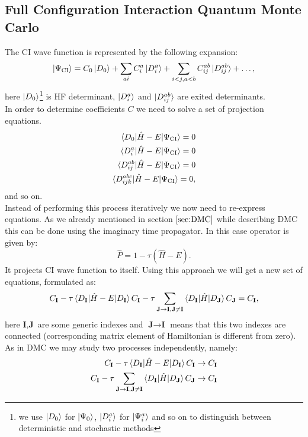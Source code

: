 \documentclass[twoside,english]{uiofysmaster}
\theoremstyle{definition}
\begin{document}
\subsection{Full Configuration Interaction Quantum Monte Carlo}
The CI wave function is represented by the following expansion:
 \begin{equation}\label{eq:fciqmcWF}
\ket{\Psi_{\text{CI}}}= C_0\ket{D_0} + \sum_{ai} C_i^a \ket{D_i^a} + \sum_{i<j,a<b}C_{ij}^{ab}\ket{D_{ij}^{ab}} + \dots,
 \end{equation}
here $\ket{D_0}$\footnote{we use $\ket{D_0}$ for $\ket{\Psi_0}$, $\ket{D_i^a}$ for $\ket{\Psi_i^a}$ and so on to distinguish between deterministic and stochastic methods} is HF determinant, $\ket{D_i^a}$ and $\ket{D_{ij}^{ab}}$ are exited determinants.\\
In order to determine coefficients $C$ we need to solve a set of projection equations. 
\begin{align}
\braket{D_0|\hat{H}-E|\Psi_{\text{CI}}}=0\\
\braket{D_i^a|\hat{H}-E|\Psi_{\text{CI}}}=0\\
\braket{D_{ij}^{ab}|\hat{H}-E|\Psi_{\text{CI}}}=0\\
\braket{D_{ijk}^{abc}|\hat{H}-E|\Psi_{\text{CI}}}=0,
\end{align} 
and so on.\\
Instead of performing this process iteratively we now need to re-express equations. As we already mentioned in section $\ref{sec:DMC}$ while describing DMC this can be done using the imaginary time propagator. In this case operator is given by:
\begin{equation}\label{eq:projector} 
\hat{P}=1-\tau(\hat{H}-E).
\end{equation}
It projects CI wave function to itself. Using this approach we will get a new set of equations, formulated as:
\begin{equation}\label{eq:CIprojected}
C_{\textbf{I}} - \tau \braket{D_{\textbf{I}}|\hat{H}-E|D_{\textbf{I}}}C_{\textbf{I}} - \tau \sum_{\textbf{J}\rightarrow \textbf{I},\textbf{J}\neq \textbf{I} }  \braket{D_{\textbf{I}}|\hat{H}|D_{\textbf{J}}}C_{\textbf{J}} = C_{\textbf{I}},
\end{equation}
here $\textbf{I}, \textbf{J}$ are some generic indexes and $\textbf{J}\rightarrow \textbf{I}$ means that this two indexes are connected (corresponding matrix element of Hamiltonian is different from zero).
As in DMC we may study two processes independently, namely:
\begin{align}
C_{\textbf{I}} - \tau \braket{D_{\textbf{I}}|\hat{H}-E|D_{\textbf{I}}}C_{\textbf{I}} \rightarrow C_{\textbf{I}}\\\label{eq:FCIQMC_coef1}
C_{\textbf{I}} - \tau \sum_{\textbf{J}\rightarrow \textbf{I},\textbf{J}\neq \textbf{I} }  \braket{D_{\textbf{I}}|\hat{H}|D_{\textbf{J}}}C_{\textbf{J}} \rightarrow C_{\textbf{I}}\\ \label{eq:FCIQMC_coef2}
\end{align}
\end{document}
